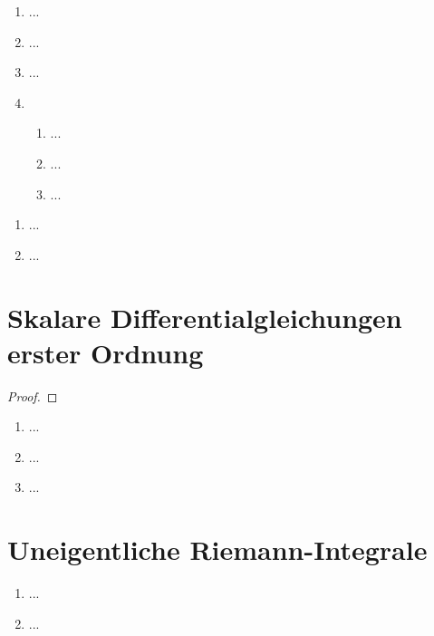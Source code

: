 \documentclass[12pt]{scrreprt}
\begin{document}
\begin{enumerate}
\item ...
\item ...
\item ...
\item \begin{enumerate}
\item ...
\item ...
\item ...
\end{enumerate}
\end{enumerate}

\begin{bsp}\label{}
\begin{enumerate}
\item ...
\item ...
\end{enumerate}
\end{bsp}

\section{Skalare Differentialgleichungen erster Ordnung}
\label{}

\begin{bsp*}

\end{bsp*}

\begin{satz}\label{}

\end{satz}
\begin{proof}

\end{proof}

\begin{bsp}\label{}
\begin{enumerate}
\item ...
\item ...
\item ...
\end{enumerate}
\end{bsp}

\section{Uneigentliche Riemann-Integrale}
\label{}

\begin{dfn}\label{}
\begin{enumerate}
\item ...
\item ...
\end{enumerate}
\end{dfn}
\end{document}
